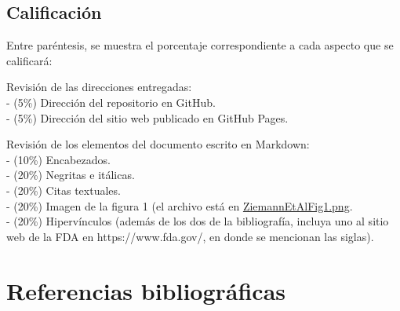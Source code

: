 \documentclass[
  letterpaper,
  DIV=11,
  numbers=noendperiod]{scrreprt}
\begin{document}
\hypertarget{calificaciuxf3n}{%
\section*{Calificación}\label{calificaciuxf3n}}

Entre paréntesis, se muestra el porcentaje correspondiente a cada
aspecto que se calificará:

Revisión de las direcciones entregadas:\\
- (5\%) Dirección del repositorio en GitHub.\\
- (5\%) Dirección del sitio web publicado en GitHub Pages.

Revisión de los elementos del documento escrito en Markdown:\\
- (10\%) Encabezados.\\
- (20\%) Negritas e itálicas.\\
- (20\%) Citas textuales.\\
- (20\%) Imagen de la figura 1 (el archivo está en
\href{img/ZiemannEtAlFig1.png}{ZiemannEtAlFig1.png}.\\
- (20\%) Hipervínculos (además de los dos de la bibliografía, incluya
uno al sitio web de la FDA en https://www.fda.gov/, en donde se
mencionan las siglas).


\hypertarget{referencias-bibliogruxe1ficas}{%
\chapter*{Referencias
bibliográficas}\label{referencias-bibliogruxe1ficas}}
\end{document}
